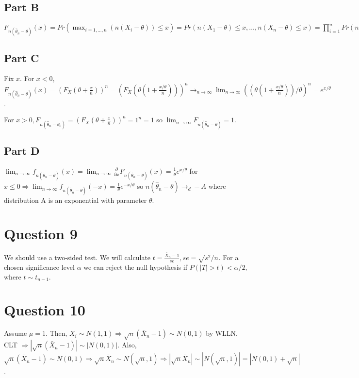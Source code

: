 \documentclass[11pt]{article} %
\begin{document}
\subsection{Part B}
$F_{n(\hat{\theta}_n - \theta)}(x) = Pr(\max_{i=1,\dots,n}(n(X_i - \theta))\leq x) = Pr(n(X_1 - \theta) \leq x,\dots,n(X_n - \theta) \leq x) = \prod_{i=1}^n Pr(n(X_i - \theta)\leq x) = \prod_{i=1}^nPr(X_i\leq \theta + \frac{x}{n}) = Pr(X_i\leq \theta + \frac{x}{n})^n = (F_X(\theta + \frac{x}{n}))^n.$
\subsection{Part C}
Fix $x$. For $x<0$, $F_{n(\hat{\theta}_n - \theta)}(x) =(F_X(\theta + \frac{x}{n}))^n = (F_X(\theta(1 + \frac{x/\theta}{n})))^n  \rightarrow_{n\rightarrow \infty} \lim_{n\rightarrow \infty} ((\theta(1 + \frac{x/\theta}{n}))/\theta)^n = e^{x/\theta} $.

For $x>0, F_{n(\hat{\theta}_n - \theta_0)} = (F_{X}(\theta + \frac{x}{n}))^n = 1^n =1$ so $\lim_{n\rightarrow \infty}F_{n(\hat{\theta}_n - \theta)} = 1.$
\subsection{Part D}
$\lim_{n\rightarrow \infty}f_{n(\hat{\theta}_n - \theta)}(x) =\lim_{n\rightarrow \infty} \frac{\partial}{\partial x}F_{n(\hat{\theta}_n - \theta)}(x) = \frac{1}{\theta}e^{x/\theta}  $ for $x\leq0 \Rightarrow \lim_{n\rightarrow \infty}f_{n(\hat{\theta}_n - \theta)}(-x) = \frac{1}{\theta}e^{-x/\theta} $ so $n(\hat{\theta}_n - \theta)\rightarrow_d -A$ where distribution A is an exponential with parameter $\theta$.

\section{Question 9} %
We should use a two-sided test. We will calculate $t = \frac{\bar{X}_n - 1}{se},se = \sqrt{s^2/n}.$ For a chosen significance level $\alpha$ we can reject the null hypothesis if $P(|T|> t) < \alpha/2$, where $t \sim t_{n-1}$.

\section{Question 10}  %
Assume $\mu = 1.$ Then, $X_i \sim N(1,1) \Rightarrow \sqrt{n}(\bar{X}_n - 1) \sim N(0,1)$ by WLLN, CLT $\Rightarrow |\sqrt{n}(\bar{X}_n - 1)| \sim |N(0,1)|.$ Also, $\sqrt{n}(\bar{X}_n - 1) \sim N(0,1) \Rightarrow \sqrt{n}\bar{X}_n \sim N(\sqrt{n},1) \Rightarrow |\sqrt{n}\bar{X}_n| \sim |N(\sqrt{n},1)| = |N(0,1) + \sqrt{n}|$.
\end{document}
